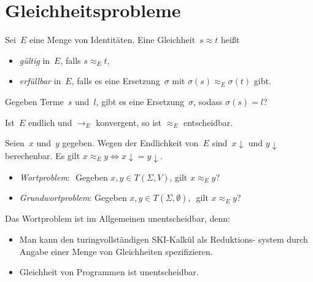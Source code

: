 \documentclass{cheat-sheet}
\newcommand{\NF}[1]{{{#1}\!\downarrow}} %
\newcommand{\ident}{\approx} %
\begin{document}
\section{Gleichheitsprobleme}

\begin{defn}
  Sei~$E$ eine Menge von Identitäten.
  Eine Gleichheit~$s \ident t$ heißt
  \begin{itemize}
    \item \emph{gültig} in~$E$, falls $s \ident_E t$,
    \item \emph{erfüllbar} in~$E$, falls es eine Ersetzung~$\sigma$ mit $\sigma(s) \ident_E \sigma(t)$ gibt.
  \end{itemize}
\end{defn}


\begin{problem}
  Gegeben Terme~$s$ und~$l$, gibt es eine Ersetzung~$\sigma$, sodass $\sigma(s) = l$?
\end{problem}

\begin{thm}
  Ist~$E$ endlich und $\to_E$ konvergent, so ist ${\approx_E}$ entscheidbar.
\end{thm}

\begin{alg}
  Seien~$x$ und~$y$ gegeben.
  Wegen der Endlichkeit von~$E$ sind~$\NF{x}$ und $\NF{y}$ berechenbar.
  Es gilt $x \ident_E y \iff \NF{x} = \NF{y}$.
\end{alg}

\begin{defn}
  \begin{itemize}
    \item \emph{Wortproblem}: \,\,Gegeben $x, y \in T(\Sigma, V)$, gilt $x \ident_E y$?
    \item \emph{Grundwortproblem}: Gegeben $x, y \in T(\Sigma, \emptyset)$,\,\, gilt $x \ident_E y$?
  \end{itemize}
\end{defn}

\begin{bem}
  Das Wortproblem ist im Allgemeinen unentscheidbar, denn:
  \begin{itemize}
    \item Man kann den turingvollständigen SKI-Kalkül als Reduktions- system durch Angabe einer Menge von Gleichheiten spezifizieren.
    \item Gleichheit von Programmen ist unentscheidbar.
  \end{itemize}
\end{bem}
\end{document}
